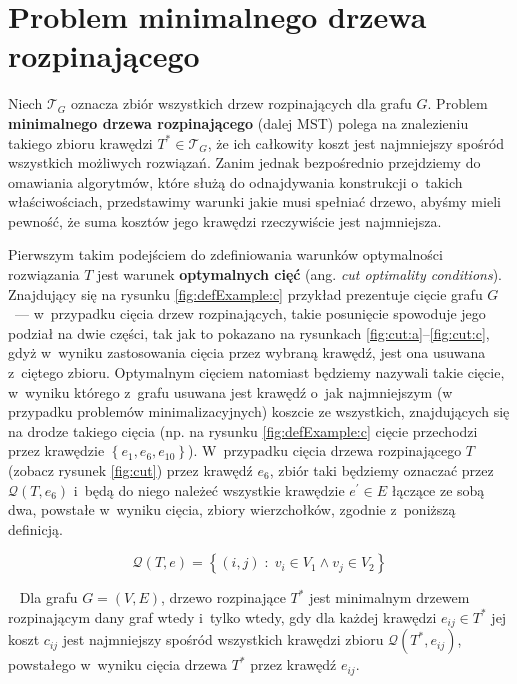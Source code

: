 \section{Problem minimalnego drzewa rozpinającego}\label{sec:mst}




Niech $\mathcal{T}_{G}$ oznacza zbiór wszystkich drzew rozpinających dla grafu $G$.
Problem \textbf{minimalnego drzewa rozpinającego} (dalej \textsc{MST}) polega na znalezieniu takiego zbioru krawędzi $T^{\ast} \in \mathcal{T}_{G}$, że ich całkowity koszt jest najmniejszy spośród wszystkich możliwych rozwiązań.
Zanim jednak bezpośrednio przejdziemy do omawiania algorytmów, które służą do odnajdywania konstrukcji o~takich właściwościach, przedstawimy warunki jakie musi spełniać drzewo, abyśmy mieli pewność, że suma kosztów jego krawędzi rzeczywiście jest najmniejsza.

Pierwszym takim podejściem do zdefiniowania warunków optymalności rozwiązania $T$ jest warunek \textbf{optymalnych cięć} (ang. \textit{cut optimality conditions}).
Znajdujący się na rysunku \ref{fig:defExample:c} przykład prezentuje cięcie grafu $G$~--- w~przypadku cięcia drzew rozpinających, takie posunięcie spowoduje jego podział na dwie części, tak jak to pokazano na rysunkach \ref{fig:cut:a}--\ref{fig:cut:c}, gdyż w~wyniku zastosowania cięcia przez wybraną krawędź, jest ona usuwana z~ciętego zbioru.
Optymalnym cięciem natomiast będziemy nazywali takie cięcie, w~wyniku którego z~grafu usuwana jest krawędź o~jak najmniejszym (w przypadku problemów minimalizacyjnych) koszcie ze wszystkich, znajdujących się na drodze takiego cięcia (np. na rysunku \ref{fig:defExample:c} cięcie przechodzi przez krawędzie $\left\{ e_{1}, e_{6}, e_{10} \right\}$).
W~przypadku cięcia drzewa rozpinającego $T$ (zobacz rysunek \ref{fig:cut}) przez krawędź $e_{6}$, zbiór taki będziemy oznaczać przez $\mathcal{Q} \left( T, e_{6} \right)$ i~będą do niego należeć wszystkie krawędzie $e^{\prime} \in E$ łączące ze sobą dwa, powstałe w~wyniku cięcia, zbiory wierzchołków, zgodnie z~poniższą definicją.

\begin{equation}\label{eq:treecutedgeset}
	\mathcal{Q} \left( T, e \right) = \left\{ \left( i, j \right) \; : \; v_{i} \in V_{1} \wedge v_{j} \in V_{2} \right\}
\end{equation}

\begin{theorem}\label{def:optmstcut}~\cite[$516$--$518$]{Ahuja:1993:NFT:137406}
	Dla grafu $G = \left( V, E \right)$, drzewo rozpinające $T^{\ast}$ jest minimalnym drzewem rozpinającym dany graf wtedy i~tylko wtedy, gdy dla każdej krawędzi $e_{ij} \in T^{\ast}$ jej koszt $c_{ij}$ jest najmniejszy spośród wszystkich krawędzi zbioru $\mathcal{Q} \left( T^{\ast}, e_{ij} \right)$, powstałego w~wyniku cięcia drzewa $T^{\ast}$ przez krawędź $e_{ij}$.
\end{theorem}

